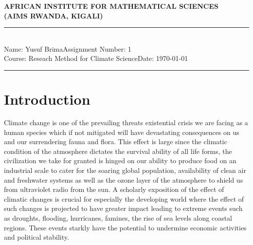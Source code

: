 \documentclass[12pt,a4paper]{article}
\newcommand{\student}{Yusuf Brima}
\newcommand{\course}{Reseach Method for Climate Science}
\newcommand{\assignment}{1}
\begin{document}
\thispagestyle{empty}
\begin{center}
\textbf{AFRICAN INSTITUTE FOR MATHEMATICAL SCIENCES \\[0.5cm]
(AIMS RWANDA, KIGALI)}
\vspace{1.0cm}
\end{center}

\noindent
\rule{17cm}{0.2cm}\\[0.3cm]
Name: \student \hfill Assignment Number: \assignment\\[0.1cm]
Course: \course \hfill Date: \today\\
\rule{17cm}{0.05cm}
\vspace{1.0cm}
\pagebreak
\begin{abstract}
The world is rapidly evolving at an unprecedented rate largely due to human actions on the environment. The effects of  this  change is being noticed through variable patterns in the climate across the global which is projected to have unforeseen consequences in the near and far future. Climate change is a prevailing threat existential crisis we are facing as a human species which if not mitigated will have devastating consequences on us and our surrendering fauna and flora. Therefore,  in this work,  we use state-of-the-art Hierarchical Cluster Analysis (CA) and Principal Component Analysis (PCA) algorithms. We found four clusters for the 10 cities with similar Potential Evapotranspiration and using PCA (both non rotated and rotated) to identify the underlying processes that gave rise to the factors of variation int the data set wherein we identified two principal components using varimax that explain nearly 90 per cent of variability in the data. 
\end{abstract}
\pagebreak
\tableofcontents
\pagebreak
\section{Introduction}
Climate change is one of the prevailing threats existential crisis we are facing as a human species which if not mitigated will have devastating consequences on us and our surrendering fauna and flora. This effect is large since the climatic condition of the atmosphere dictates the survival ability of all life forms, the civilization we take for granted is hinged on our ability to produce food on an industrial scale to cater for the soaring global population, availability of clean air and freshwater systems as well as the ozone layer of the atmosphere to shield us from ultraviolet radio from the sun.
A scholarly exposition of the effect of climatic changes is crucial for especially the developing world where the effect of such changes is projected to have greater impact leading to extreme events such as droughts, flooding,  hurricanes, famines, the rise of sea levels along coastal regions.  These events starkly have the potential to undermine economic activities and political stability.
\end{document}
